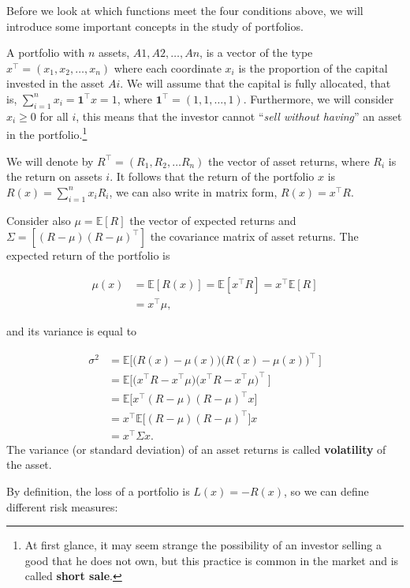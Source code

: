 Before we look at which functions meet the four conditions above,
we will introduce some important concepts in the study of portfolios.

A portfolio with $n$ assets, $A1, A2, \dots, An$, is a vector of the type
$x^\top = (x_1, x_2, \dots, x_n)$ where each coordinate $x_i$ is the
proportion of the capital invested in the asset $Ai$. We will assume that the capital
is fully allocated, that is, $\sum_{i=1}^n x_i = \textbf{1}^\top x=1$, where
$ \mathbf{1}^\top= (1,1,\dots,1)$. Furthermore, we will consider $x_i\geq 0$ for all $i$, this means that the investor cannot ``\textit{sell without having}'' an asset in the portfolio.\footnote{At first glance, it may seem strange the possibility of an investor selling a good that he does not own, but this practice is common in the market and is called \textbf{short sale}.}


We will denote by $R^\top = (R_1, R_2, \dots R_n)$ the vector of asset returns, where $R_i$ is the return on assets $i$. It follows that the return of the portfolio $x$ is $R(x) = \sum_{i=1}^n x_i R_i$, we can also write in matrix form, $R(x) = x^\top R$.

Consider also $\mu = \mathbb{E}[R]$ the vector of expected returns and $\Sigma = [(R-\mu)(R-\mu)^\top]$ the covariance matrix of asset returns. The expected return of the portfolio is

\[
\begin{aligned}
\mu(x) & = \mathbb{E}[R(x)]=\mathbb{E}[x^\top R] = x^\top \mathbb{E}[R] \\
& = x^\top \mu,
\end{aligned}
\]

and its variance is equal to

\[
\begin{aligned}
\sigma^2 & = \mathbb{E}\Big[\Big(R(x)-\mu(x)\Big)\Big(R(x)-\mu(x)\Big)^\top\ \Big] \\
& = \mathbb{E}\Big[\Big(x^\top R - x^\top \mu \Big)\Big(x^\top R - x^\top \mu \Big)^\top \ \Big] \\
& = \mathbb{E}\Big[x^\top(R-\mu)(R-\mu)^\top x \Big] \\
& = x^\top \mathbb{E}\Big[(R-\mu)(R-\mu)^\top \Big] x \\
& = x^\top \Sigma x.
\end{aligned}
\]
The variance (or standard deviation) of an asset returns is called \textbf{volatility} of the asset.

By definition, the loss of a portfolio is $L(x) = -R(x)$, so we can define different risk measures:

